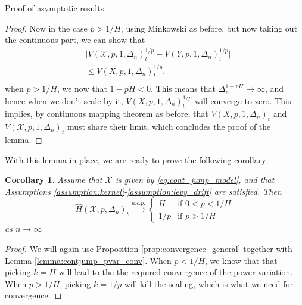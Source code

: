 \documentclass[fleqn,11pt,letterpaper]{article}
\theoremstyle{plain}
\newtheorem{corollary}{Corollary}[section]
\theoremstyle{definition}
\theoremstyle{remark}
\numberwithin{equation}{section}
\begin{document}
\begin{section}{Proof of asymptotic results}
\begin{proof}
    Now in the case $p>1/H$, using Minkowski as before, but now taking out the continuous part, we can show that 
    \begin{equation}
        \begin{split}
                &\vert V(\mathcal{X},p,1,\Delta_n)^{1/p}_t -V(Y,p,1,\Delta_n)^{1/p}_t\vert\\&\leq V(X,p,1,\Delta_n)^{1/p}_t.\\
        \end{split}
    \end{equation}     
    when $p>1/H$, we now that $1-pH<0$. This means that $\Delta_n^{1-pH}\to\infty$, and hence when we don't scale by it, $V(X,p,1,\Delta_n)^{1/p}_t$ will converge to zero. This implies, by continuous mapping theorem as before, that $V(X,p,1,\Delta_n)_t$ and $V(\mathcal{X},p,1,\Delta_n)_t$ must share their limit, which concludes the proof of the lemma. 
\end{proof}

With this lemma in place, we are ready to prove the following corollary: 

\begin{corollary}
    Assume that $\mathcal{X}$ is given by \eqref{eq:cont_jump_model}, and that Assumptions \ref{assumption:kernel}-\ref{assumption:levy_drift} are satisfied. Then
    \begin{equation}
        \hat{H}(\mathcal{X},p,\Delta_n)_t\overset{u.c.p.}{\to}\begin{cases}
    H & \text{if }0<p<1/H\\
    1/p & \text{if }p>1/H
    \end{cases}
    \end{equation}
    as $n\to\infty$    
\end{corollary}

\begin{proof}
    We will again use Proposition \ref{prop:convergence_general} together with Lemma \ref{lemma:contjump_pvar_conv}. When $p<1/H$, we know that that picking $k=H$ will lead to the the required convergence of the power variation. When $p>1/H$, picking $k=1/p$ will kill the scaling, which is what we need for convergence. 
\end{proof}


\end{section}
\end{document}
